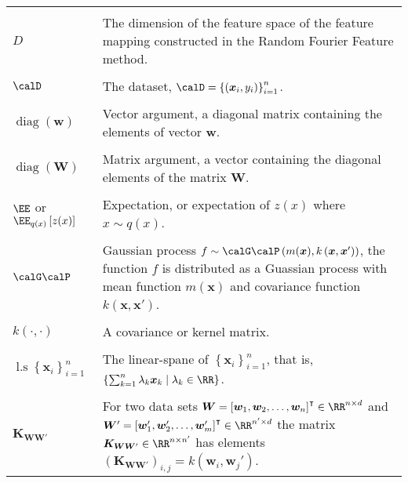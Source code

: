 \begin{longtable}{lp{}}
    \\\\
    $D$                                                                                                        & The dimension of the feature space of the feature mapping constructed in the Random Fourier Feature method.
    \\\\
    $\calD$                                                                                                    & The dataset, $\calD = \left\{ \left( \bm{x}_i , y_{i} \right) \right\}_{i=1}^{n}$.
    \\\\
    $\operatorname{diag} \left( \bm{w} \right)$                                                                & Vector argument, a diagonal matrix containing the elements of vector $\bm{w}$.
    \\\\
    $\operatorname{diag} \left( \bm{W} \right)$                                                                & Matrix argument, a vector containing the diagonal elements of the matrix $\bm{W}$.
    \\\\
    $\EE$ or $\EE_{q(x)} \left[ z(x) \right]$                                                                  & Expectation, or expectation of $z(x)$ where $x \sim q(x)$.
    \\\\
    $\calG \calP$                                                                                              & Gaussian process $f \sim \calG \calP \left( m (\bm{x}), k \left( \bm{x}, \bm{x}' \right) \right)$, the function $f$ is distributed as a Guassian process with mean function $m \left( \bm{x} \right)$ and covariance function $k \left( \bm{x}, \bm{x}' \right)$.
    \\\\
    $k \left( \cdot , \cdot \right)$                                                                           & A covariance or kernel matrix.
    \\\\
    $\operatorname{l.s} \left\{ \bm{x}_i  \right\}_{i=1}^{n}$                                                  & The linear-spane of $\left\{ \bm{x}_i  \right\}_{i=1}^{n}$, that is, $\left\{ \sum_{k=1}^{n} \lambda_k \bm{x}_k \mid \lambda_k \in \RR \right\}$.
    \\\\
    $\bm{K}_{\bm{W} \bm{W}'}$                                                                                  & For two data sets $\bm{W} = \left[ \bm{w}_1 ,\bm{w}_2 , \ldots , \bm{w}_n \right]^{\intercal} \in \RR^{n \times d}$ and $\bm{W}' = \left[ \bm{w}_1' ,\bm{w}_2' , \ldots , \bm{w}_m' \right]^{\intercal} \in \RR^{n' \times d}$ the matrix \( \bm{K}_{\bm{W} \bm{W}'} \in \RR^{n \times n'} \) has elements $\left( \bm{K}_{\bm{W} \bm{W}'} \right)_{i,j} = k \left( \bm{w}_i , \bm{w}_j' \right)$.

\end{longtable}
